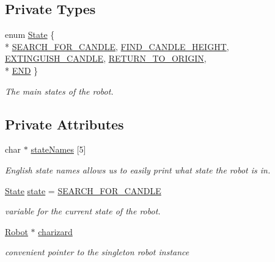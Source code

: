 \subsection*{Private Types}
\begin{DoxyCompactItemize}
\item 
enum \hyperlink{classMain_a551231243a758b95cf29d8ed2b7508da}{State} \{ \\*
\hyperlink{classMain_a551231243a758b95cf29d8ed2b7508daa9229c9e5dce20fda7fd5bbd54799fb32}{S\-E\-A\-R\-C\-H\-\_\-\-F\-O\-R\-\_\-\-C\-A\-N\-D\-L\-E}, 
\hyperlink{classMain_a551231243a758b95cf29d8ed2b7508daab2b9975fcdb8d0d79230156c24adf5b4}{F\-I\-N\-D\-\_\-\-C\-A\-N\-D\-L\-E\-\_\-\-H\-E\-I\-G\-H\-T}, 
\hyperlink{classMain_a551231243a758b95cf29d8ed2b7508daaf335b92cf0219a9b661613556bbe96b6}{E\-X\-T\-I\-N\-G\-U\-I\-S\-H\-\_\-\-C\-A\-N\-D\-L\-E}, 
\hyperlink{classMain_a551231243a758b95cf29d8ed2b7508daa3ff87a64146af251296a5ce0a05e923d}{R\-E\-T\-U\-R\-N\-\_\-\-T\-O\-\_\-\-O\-R\-I\-G\-I\-N}, 
\\*
\hyperlink{classMain_a551231243a758b95cf29d8ed2b7508daa6c2f5ff7b13123b1b782ac3664f20087}{E\-N\-D}
 \}
\begin{DoxyCompactList}\small\item\em The main states of the robot. \end{DoxyCompactList}\end{DoxyCompactItemize}
\subsection*{Private Attributes}
\begin{DoxyCompactItemize}
\item 
char $\ast$ \hyperlink{classMain_a10090d1fa7fa606c1bf7c5bdf23d7eda}{state\-Names} \mbox{[}5\mbox{]}
\begin{DoxyCompactList}\small\item\em English state names allows us to easily print what state the robot is in. \end{DoxyCompactList}\item 
\hyperlink{classMain_a551231243a758b95cf29d8ed2b7508da}{State} \hyperlink{classMain_a8b4ada43c3c3720b177018191ac6ee90}{state} = \hyperlink{classMain_a551231243a758b95cf29d8ed2b7508daa9229c9e5dce20fda7fd5bbd54799fb32}{S\-E\-A\-R\-C\-H\-\_\-\-F\-O\-R\-\_\-\-C\-A\-N\-D\-L\-E}
\begin{DoxyCompactList}\small\item\em variable for the current state of the robot. \end{DoxyCompactList}\item 
\hyperlink{classRobot}{Robot} $\ast$ \hyperlink{classMain_a6b8534d72e39e2b43c3d46f2ca6e49f4}{charizard}
\begin{DoxyCompactList}\small\item\em convenient pointer to the singleton robot instance \end{DoxyCompactList}\end{DoxyCompactItemize}


